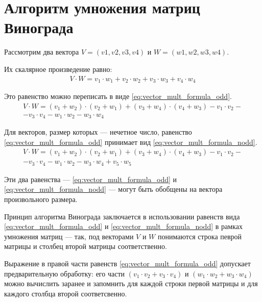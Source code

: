 \documentclass[12pt]{report}
\begin{document}
\section{Алгоритм умножения матриц Винограда}

Рассмотрим два вектора $V = (v1, v2, v3, v4)$ и $W = (w1, w2, w3, w4)$. 

Их скалярное произведение равно:
\begin{equation}
	\begin{aligned}
		\label{eq:vector_mult_formula}
		V \cdot W=v_1 \cdot w_1 + v_2 \cdot w_2 + v_3 \cdot w_3 + v_4 \cdot w_4
	\end{aligned}
\end{equation}


Это равенство можно переписать в виде \ref{eq:vector_mult_formula_odd}.
\begin{equation}
	\begin{aligned}
		\label{eq:vector_mult_formula_odd}
		V \cdot W=(v_1 + w_2) \cdot (v_2 + w_1) + (v_3 + w_4) \cdot (v_4 + w_3) - v_1 \cdot v_2 -\\
		- v_3 \cdot v_4 - w_1 \cdot w_2 - w_3 \cdot w_4
	\end{aligned}
\end{equation}

Для векторов, размер которых --- нечетное число, равенство \ref{eq:vector_mult_formula_odd} принимает вид \ref{eq:vector_mult_formula_nodd}.  
\begin{equation}
	\label{eq:vector_mult_formula_nodd}
	\begin{aligned}
		V \cdot W=(v_1 + w_2) \cdot (v_2 + w_1) + (v_3 + w_4) \cdot (v_4 + w_3) - v_1 \cdot v_2 -\\
		- v_3 \cdot v_4 - w_1 \cdot w_2 - w_3 \cdot w_4 + v_5 \cdot w_5
	\end{aligned}
\end{equation}

Эти два равенства --- \ref{eq:vector_mult_formula_odd} и \ref{eq:vector_mult_formula_nodd} --- могут быть обобщены на вектора произвольного размера.

Принцип алгоритма Винограда заключается в использовании равенств вида \ref{eq:vector_mult_formula_odd} и \ref{eq:vector_mult_formula_nodd} в рамках умножения матриц --- так, под векторами $V$ и $W$ понимаются строка певрой матрицы и столбец второй матрицы соответственно.

Выражение в правой части равенств \ref{eq:vector_mult_formula_odd} допускает предварительную обработку: его части $(v_1 \cdot v_2 + v_3 \cdot v_4)$ и $(w_1 \cdot w_2 + w_3 \cdot w_4)$ можно вычислить заранее и запомнить для каждой строки первой матрицы и для каждого столбца второй соответсвенно. 
\end{document}
